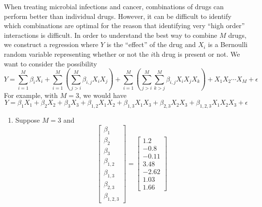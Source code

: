 \begin{exercise}
When treating microbial infections and cancer, combinations of drugs can perform better than individual drugs. However, it can be difficult to identify which combinations are optimal for the reason that identifying very ``high order'' interactions is difficult.  In order to understand the best way to combine $M$ drugs, we construct a regression where $Y$ is the ``effect'' of the drug and $X_i$ is a Bernoulli random variable representing whether or not the $i$th drug is present or not. We want to consider the possibility 
\begin{equation*}
Y = \sum_{i=1}^M \beta_iX_i + \sum_{i=1}^M\left(\sum_{j>i}^M \beta_{i,j}X_iX_j \right)+  \sum_{i=1}^M\left(\sum_{j>i}^M\sum_{k>j}^M  \beta_{i,j}X_iX_jX_k\right) + X_1X_2\cdots X_M + \epsilon 
\end{equation*}
For example, with $M=3$, we would have 
\begin{equation*}
Y = \beta_1X_1+\beta_2X_2 + \beta_3X_3 + \beta_{1,2}X_1X_2 + \beta_{1,3}X_1X_3 +\beta_{2,3}X_2X_3+ \beta_{1,2,3}X_1X_2X_3 + \epsilon 
\end{equation*}
\begin{enumerate}[label=(\alph*)]
\item Suppose $M=3$ and 
\begin{equation*}
\left[\begin{array}{c}
\beta_1\\\beta_2\\\beta_3\\\beta_{1,2}\\ \beta_{1,3}\\\beta_{2,3}\\ \beta_{1,2,3}
\end{array}\right]=\left[\begin{array}{c} 
1.2\\ -0.8\\ -0.11\\ 3.48\\ -2.62\\1.03\\  1.66
\end{array}\right]
\end{equation*}

\end{enumerate}
\end{exercise}
